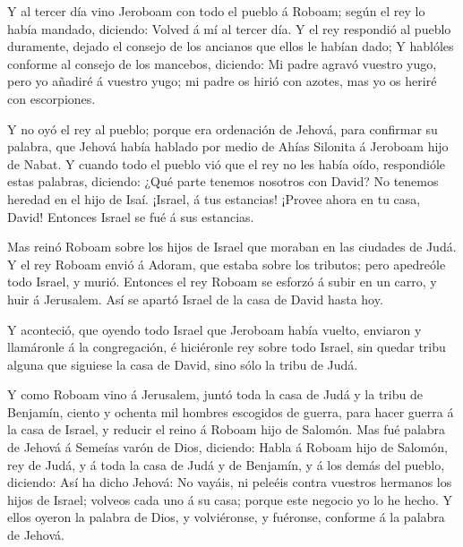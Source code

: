  Y al tercer día vino Jeroboam con todo el pueblo á Roboam;
según el rey lo había mandado, diciendo: Volved á mí al tercer día.
 Y el rey respondió al pueblo duramente, dejado el consejo
de los ancianos que ellos le habían dado;  Y hablóles
conforme al consejo de los mancebos, diciendo: Mi padre agravó vuestro
yugo, pero yo añadiré á vuestro yugo; mi padre os hirió con azotes, mas
yo os heriré con escorpiones.

 Y no oyó el rey al pueblo; porque era ordenación de
Jehová, para confirmar su palabra, que Jehová había hablado por medio de
Ahías Silonita á Jeroboam hijo de Nabat.  Y cuando todo el
pueblo vió que el rey no les había oído, respondióle estas palabras,
diciendo: ¿Qué parte tenemos nosotros con David? No tenemos heredad en
el hijo de Isaí. ¡Israel, á tus estancias! ¡Provee ahora en tu casa,
David! Entonces Israel se fué á sus estancias.

 Mas reinó Roboam sobre los hijos de Israel que moraban en
las ciudades de Judá.  Y el rey Roboam envió á Adoram, que
estaba sobre los tributos; pero apedreóle todo Israel, y murió. Entonces
el rey Roboam se esforzó á subir en un carro, y huir á Jerusalem.
 Así se apartó Israel de la casa de David hasta hoy.

 Y aconteció, que oyendo todo Israel que Jeroboam había
vuelto, enviaron y llamáronle á la congregación, é hiciéronle rey sobre
todo Israel, sin quedar tribu alguna que siguiese la casa de David, sino
sólo la tribu de Judá.

 Y como Roboam vino á Jerusalem, juntó toda la casa de Judá
y la tribu de Benjamín, ciento y ochenta mil hombres escogidos de
guerra, para hacer guerra á la casa de Israel, y reducir el reino á
Roboam hijo de Salomón.  Mas fué palabra de Jehová á
Semeías varón de Dios, diciendo:  Habla á Roboam hijo de
Salomón, rey de Judá, y á toda la casa de Judá y de Benjamín, y á los
demás del pueblo, diciendo:  Así ha dicho Jehová: No
vayáis, ni peleéis contra vuestros hermanos los hijos de Israel; volveos
cada uno á su casa; porque este negocio yo lo he hecho. Y ellos oyeron
la palabra de Dios, y volviéronse, y fuéronse, conforme á la palabra de
Jehová.

